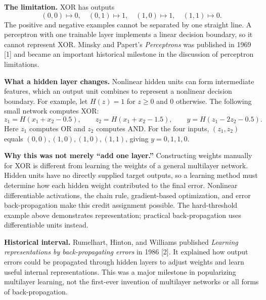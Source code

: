 \documentclass[11pt,a4paper]{article}
\begin{document}
\textbf{The limitation.} XOR has outputs
\[
(0,0)\mapsto0,\quad(0,1)\mapsto1,\quad(1,0)\mapsto1,\quad(1,1)\mapsto0.
\]
The positive and negative examples cannot be separated by one straight line. A perceptron with one trainable layer implements a linear decision boundary, so it cannot represent XOR. Minsky and Papert's \emph{Perceptrons} was published in 1969 [1] and became an important historical milestone in the discussion of perceptron limitations.

\textbf{What a hidden layer changes.} Nonlinear hidden units can form intermediate features, which an output unit combines to represent a nonlinear decision boundary. For example, let $H(z)=1$ for $z\geq0$ and $0$ otherwise. The following small network computes XOR:
\[
z_1=H(x_1+x_2-0.5),\qquad z_2=H(x_1+x_2-1.5),
\qquad y=H(z_1-2z_2-0.5).
\]
Here $z_1$ computes OR and $z_2$ computes AND. For the four inputs, $(z_1,z_2)$ equals $(0,0),(1,0),(1,0),(1,1)$, giving $y=0,1,1,0$.

\begin{center}
\end{center}
\textbf{Why this was not merely ``add one layer.''} Constructing weights manually for XOR is different from learning the weights of a general multilayer network. Hidden units have no directly supplied target outputs, so a learning method must determine how each hidden weight contributed to the final error. Nonlinear differentiable activations, the chain rule, gradient-based optimization, and error back-propagation make this credit assignment possible. The hard-threshold example above demonstrates representation; practical back-propagation uses differentiable units instead.

\newpage
\textbf{Historical interval.} Rumelhart, Hinton, and Williams published \emph{Learning representations by back-propagating errors} in 1986 [2]. It explained how output errors could be propagated through hidden layers to adjust weights and learn useful internal representations. This was a major milestone in popularizing multilayer learning, not the first-ever invention of multilayer networks or all forms of back-propagation.
\end{document}
